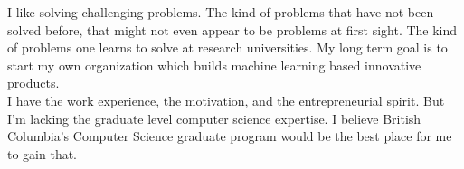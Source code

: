 \documentclass{article}
\begin{document}
I like solving challenging problems. The kind of problems that have not been solved before, that might not even appear to be problems at first sight. The kind of problems one learns to solve at research universities.
My long term goal is to start my own organization which builds machine learning based innovative products.\\

I have the work experience, the motivation, and the entrepreneurial spirit. But I’m lacking the graduate level computer science expertise. I believe British Columbia’s Computer Science graduate program would be the best place for me to gain that.

  
\end{document}

